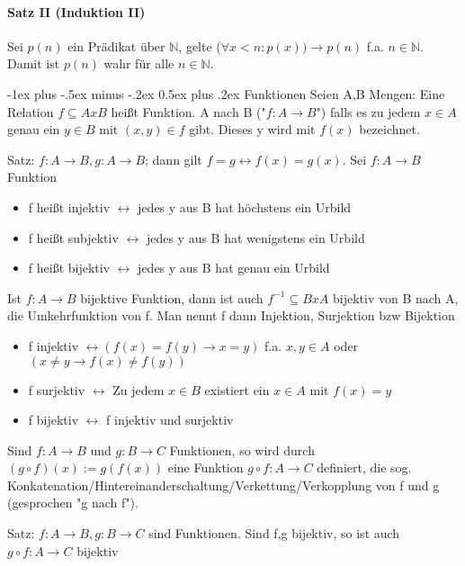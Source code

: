 \documentclass[10pt,landscape]{article}
\makeatletter
\renewcommand{\section}{\@startsection{section}{1}{0mm}%
                                {-1ex plus -.5ex minus -.2ex}%
                                {0.5ex plus .2ex}%
                                {\normalfont\large\bfseries}}
\makeatother
\begin{document}
\begin{multicols}{3}
\paragraph{Satz II (Induktion II)}
Sei $p(n)$ ein Prädikat über $\mathbb{N}$, gelte ($\forall x < n: p(x)) \rightarrow p(n)$ f.a. $n\in \mathbb{N}$. Damit ist $p(n)$ wahr für alle $n\in \mathbb{N}$.

\section{Funktionen}
Seien A,B Mengen: Eine Relation $f\subseteq A x B$ heißt Funktion. A nach B ("$f:A\rightarrow B$") falls es zu jedem $x\in A$ genau ein $y\in B$ mit $(x,y)\in f$ gibt. Dieses y wird mit $f(x)$ bezeichnet.

Satz: $f:A\rightarrow B, g:A\rightarrow B$; dann gilt $f=g \leftrightarrow f(x)=g(x)$. Sei $f:A\rightarrow B$ Funktion
\begin{itemize}
    \item f heißt injektiv $\leftrightarrow$ jedes y aus B hat höchstens ein Urbild
    \item f heißt subjektiv $\leftrightarrow$ jedes y aus B hat wenigstens ein Urbild
    \item f heißt bijektiv $\leftrightarrow$ jedes y aus B hat genau ein Urbild
\end{itemize}

Ist $f:A\rightarrow B$ bijektive Funktion, dann ist auch $f^{-1}\subseteq BxA$ bijektiv von B nach A, die Umkehrfunktion von f.
Man nennt f dann Injektion, Surjektion bzw Bijektion
\begin{itemize}
    \item f injektiv $\leftrightarrow (f(x)=f(y)\rightarrow x=y)$ f.a. $x,y\in A$ oder $(x\not = y \rightarrow f(x)\not = f(y))$
    \item f surjektiv $\leftrightarrow$ Zu jedem $x\in B$ existiert ein $x\in A$ mit $f(x)=y$
    \item f bijektiv $\leftrightarrow$ f injektiv und surjektiv
\end{itemize}

Sind $f:A\rightarrow B$ und $g:B\rightarrow C$ Funktionen, so wird durch $(g \circ f)(x):=g(f(x))$ eine Funktion $g \circ f: A \rightarrow C$ definiert, die sog. Konkatenation/Hintereinanderschaltung/Verkettung/Verkopplung von f und g (gesprochen "g nach f").

Satz: $f:A\rightarrow B, g:B\rightarrow C$ sind Funktionen. Sind f,g bijektiv, so ist auch $g \circ f: A\rightarrow C$ bijektiv


\end{multicols}
\end{document}
